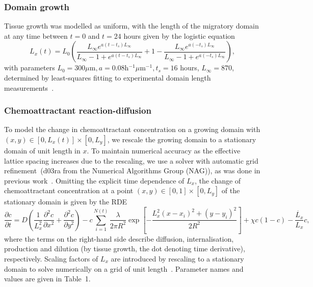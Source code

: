 \documentclass[review]{elsarticle}
\newcommand{\partialdbyd}[2]{\ensuremath{\frac{\partial #1}{\partial #2}}}
\begin{document}
        \subsubsection{Domain growth}
        Tissue growth was modelled as uniform, with the length of the migratory domain at any time between $t = 0$ and $t = 24$ hours given by the logistic equation
      \begin{equation}\label{domaingrowth}
      	L_x(t) = L_0\left(\frac{L_\infty e^{a(t-t_s)L_\infty}}{L_\infty - 1 + e^{a(t-t_s)L_\infty}} + 1 - \frac{L_\infty e^{a(-t_s)L_\infty}}{L_\infty - 1 + e^{a(-t_s)L_\infty}}\right),
      \end{equation}
      with parameters $L_0 = 300\mu\mathrm{m}, a = 0.08$h$^{-1}\mu\mathrm{m}^{-1}, t_s = 16$ hours, $L_\infty = 870$, determined by least-squares fitting to experimental domain length measurements~\cite{McLennan2012}.
        
        \subsubsection{Chemoattractant reaction-diffusion}
        To model the change in chemoattractant concentration on a growing domain with $(x,y) \in [0, L_x(t)]\times[0, L_y]$, we rescale the growing domain to a stationary domain of unit length in $x$. To maintain numerical accuracy as the effective lattice spacing increases due to the rescaling, we use a solver with automatic grid refinement~(d03ra from the Numerical Algorithms Group (NAG)), as was done in previous work~\cite{McLennan2012}. Omitting the explicit time dependence of $L_x$, the change of chemoattractant concentration at a point $(x,y) \in [0, 1]\times[0, L_y]$ of the stationary domain is given by the RDE
      \begin{equation}\label{RDE}
       \partialdbyd{c}{t} = D\left(\frac{1}{L_x^2}\partialdbyd{^2c}{x^2} 
       + \partialdbyd{^2c}{y^2}\right) - c\sum_{i=1}^{N(t)}\frac{\lambda}{2\pi R^2}\exp\left[-\frac{L_x^2(x - x_i)^2 + (y - y_i)^2}{2R^2}\right] + \chi c(1 - c) - \frac{\dot{L_x}}{L_x}c,
      \end{equation}
      where the terms on the right-hand side describe diffusion, internalisation, production and dilution (by tissue growth, the dot denoting time derivative), respectively. Scaling factors of $L_x$ are introduced by rescaling to a stationary domain to solve numerically on a grid of unit length~\cite{McLennan2012}. Parameter names and values are given in Table~1.
        
\end{document}
